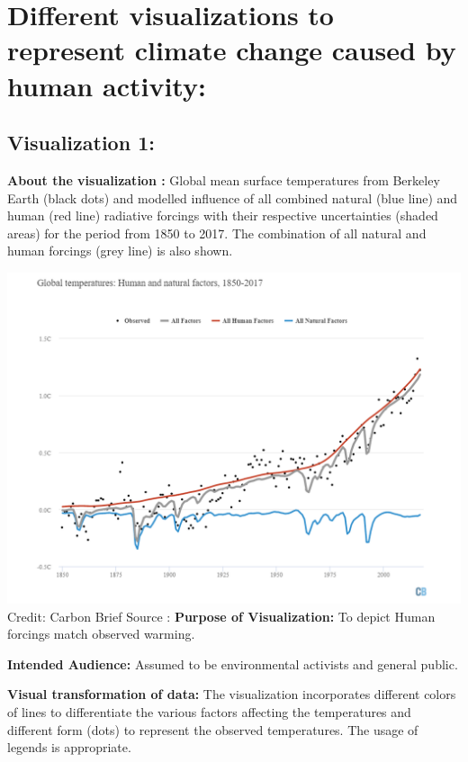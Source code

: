\documentclass[]{book}
\begin{document}
\hypertarget{different-visualizations-to-represent-climate-change-caused-by-human-activity}{%
\section{Different visualizations to represent climate change caused by human activity:}\label{different-visualizations-to-represent-climate-change-caused-by-human-activity}}

\hypertarget{visualization-1}{%
\subsection{Visualization 1:}\label{visualization-1}}

\textbf{About the visualization :}
Global mean surface temperatures from Berkeley Earth (black dots) and modelled influence of all combined natural (blue line) and human (red line) radiative forcings with their respective uncertainties (shaded areas) for the period from 1850 to 2017. The combination of all natural and human forcings (grey line) is also shown.

\includegraphics{_images/Vz1-HumanNatural.png}
Credit: Carbon Brief
Source :\citep{Global}
\textbf{Purpose of Visualization:} To depict Human forcings match observed warming.

\textbf{Intended Audience:} Assumed to be environmental activists and general public.

\textbf{Visual transformation of data:} The visualization incorporates different colors of lines to differentiate the various factors affecting the temperatures and different form (dots) to represent the observed temperatures. The usage of legends is appropriate.
\end{document}
